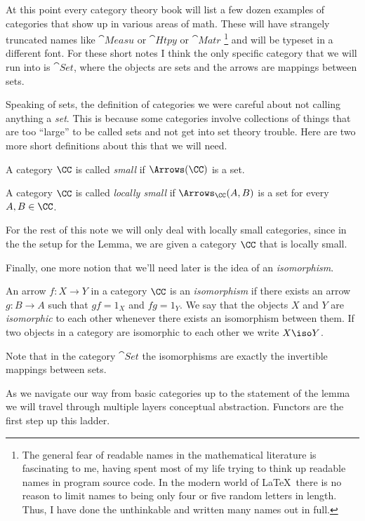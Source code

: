 At this point every category theory book will list a few dozen examples of categories that show up in various areas of math. These will have strangely truncated names like $\cat{Measu}$ or $\cat{Htpy}$ or $\cat{Matr}$%
\footnote{The general fear of readable names in the mathematical literature is fascinating to me, having spent most of my life trying to think up readable names in program source code. In the modern world of \LaTeX\ there is no reason to limit names to being only four or five random letters in length. Thus, I have done the unthinkable and written many names out in full.}%
and will be typeset in a different font. For these short notes I think the only specific category that we will run into is $\cat{Set}$, where the objects are sets and the arrows are mappings between sets.

Speaking of sets, the definition of categories we were careful about not calling anything a {\it set}. This is because some categories involve collections of things that are too ``large'' to be called sets and not get into set theory trouble. Here are two more short definitions about this that we will need.

\begin{defn}
A category $\CC$ is called {\it small} if $\Arrows(\CC)$ is a set.
\end{defn}

\begin{defn}
A category $\CC$ is called {\it locally small} if $\Arrows_{\CC}(A,B)$ is a set for every $A, B \in \CC$.
\end{defn}%
\noindent
For the rest of this note we will only deal with locally small categories, since in the the setup for the Lemma, we are given a category $\CC$ that is locally small.

Finally, one more notion that we'll need later is the idea of an {\it isomorphism}.

\begin{defn}
An arrow $f: X \to Y$ in a category $\CC$ is an {\it isomorphism} if there exists an arrow $g: B \to A$ 
such that $gf = 1_X$ and $fg = 1_Y$. We say that the objects $X$ and $Y$ are {\it isomorphic} 
to each other whenever there exists an isomorphism between them. 
If two objects in a category are isomorphic to each other we write $X \iso Y$.
\end{defn}
\noindent
Note that in the category $\cat{Set}$ the isomorphisms are exactly the invertible mappings between sets.

\medskip
As we navigate our way from basic categories up to the statement of the lemma we will travel through multiple layers conceptual abstraction. Functors are the first step up this ladder.

